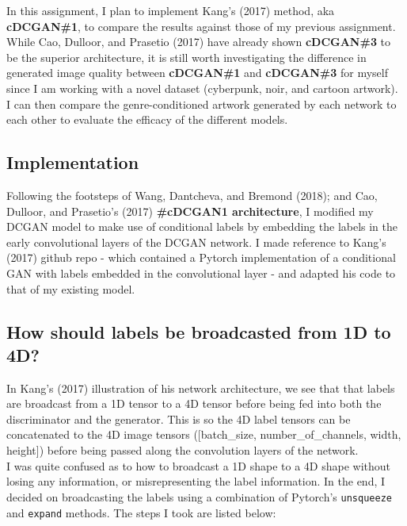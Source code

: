\documentclass[11pt]{article}
\begin{document}
In this assignment, I plan to implement Kang's (2017) method, aka
\textbf{cDCGAN\#1}, to compare the results against those of my previous
assignment. While Cao, Dulloor, and Prasetio (2017) have already shown
\textbf{cDCGAN\#3} to be the superior architecture, it is still worth
investigating the difference in generated image quality between
\textbf{cDCGAN\#1} and \textbf{cDCGAN\#3} for myself since I am working
with a novel dataset (cyberpunk, noir, and cartoon artwork). I can then
compare the genre-conditioned artwork generated by each network to each
other to evaluate the efficacy of the different models.

    \subsection{Implementation}\label{implementation}

Following the footsteps of Wang, Dantcheva, and Bremond (2018); and Cao,
Dulloor, and Prasetio's (2017) \textbf{\#cDCGAN1 architecture}, I
modified my DCGAN model to make use of conditional labels by embedding
the labels in the early convolutional layers of the DCGAN network. I
made reference to Kang's (2017) github repo - which contained a Pytorch
implementation of a conditional GAN with labels embedded in the
convolutional layer - and adapted his code to that of my existing model.

\subsection{How should labels be broadcasted from 1D to
4D?}\label{how-should-labels-be-broadcasted-from-1d-to-4d}

      \begin{center}
    \end{center}

In Kang's (2017) illustration of his network architecture, we see that
that labels are broadcast from a 1D tensor to a 4D tensor before being
fed into both the discriminator and the generator. This is so the 4D
label tensors can be concatenated to the 4D image tensors
({[}batch\_size, number\_of\_channels, width, height{]}) before being
passed along the convolution layers of the network.\\

I was quite confused as to how to broadcast a 1D shape to a 4D shape
without losing any information, or misrepresenting the label
information. In the end, I decided on broadcasting the labels using a
combination of Pytorch's \texttt{unsqueeze} and \texttt{expand} methods.
The steps I took are listed below:
\end{document}
